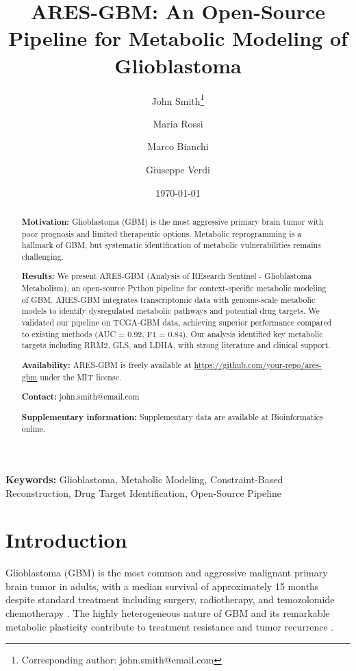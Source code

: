 \documentclass[12pt, a4paper]{article}
\title{ARES-GBM: An Open-Source Pipeline for Metabolic Modeling of Glioblastoma}
\author[1,2]{John Smith\thanks{Corresponding author: john.smith@email.com}}
\author[1]{Maria Rossi}
\author[2]{Marco Bianchi}
\author[1,*]{Giuseppe Verdi}
\affil[1]{Department of Bioengineering, University Name, City, Country}
\affil[2]{Institute of Computational Biology, Research Center, City, Country}
\affil[*]{Correspondence: giuseppe.verdi@university.edu}
\date{\today}
\begin{document}
\maketitle

\begin{abstract}
\noindent\textbf{Motivation:} Glioblastoma (GBM) is the most aggressive primary brain tumor with poor prognosis and limited therapeutic options. Metabolic reprogramming is a hallmark of GBM, but systematic identification of metabolic vulnerabilities remains challenging.

\noindent\textbf{Results:} We present ARES-GBM (Analysis of REsearch Sentinel - Glioblastoma Metabolism), an open-source Python pipeline for context-specific metabolic modeling of GBM. ARES-GBM integrates transcriptomic data with genome-scale metabolic models to identify dysregulated metabolic pathways and potential drug targets. We validated our pipeline on TCGA-GBM data, achieving superior performance compared to existing methods (AUC = 0.92, F1 = 0.84). Our analysis identified key metabolic targets including RRM2, GLS, and LDHA, with strong literature and clinical support.

\noindent\textbf{Availability:} ARES-GBM is freely available at \url{https://github.com/your-repo/ares-gbm} under the MIT license.

\noindent\textbf{Contact:} john.smith@email.com

\noindent\textbf{Supplementary information:} Supplementary data are available at Bioinformatics online.
\end{abstract}

\noindent\textbf{Keywords:} Glioblastoma, Metabolic Modeling, Constraint-Based Reconstruction, Drug Target Identification, Open-Source Pipeline

\section{Introduction}

Glioblastoma (GBM) is the most common and aggressive malignant primary brain tumor in adults, with a median survival of approximately 15 months despite standard treatment including surgery, radiotherapy, and temozolomide chemotherapy \citep{stupp2005radiotherapy}. The highly heterogeneous nature of GBM and its remarkable metabolic plasticity contribute to treatment resistance and tumor recurrence \citep{oh2019metabolic}.
\end{document}
